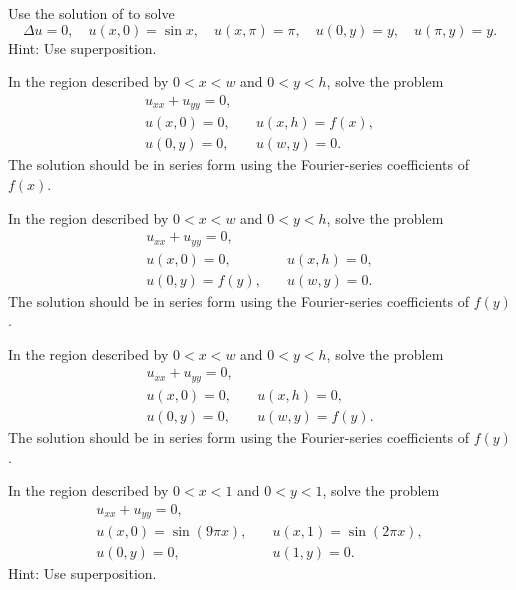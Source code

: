 \begin{exercise}
Use the solution of  to solve
\begin{equation*}
\Delta u = 0,
\quad u(x,0) = \sin x,
\quad u(x,\pi) = \pi,
\quad u(0,y) = y,
\quad u(\pi,y) = y .
\end{equation*}
Hint: Use superposition.
\end{exercise}

\begin{exercise}
In the region described by $0 < x < w$ and $0 < y < h$,
solve the problem
\begin{equation*}
\begin{array}{ll}
u_{xx} + u_{yy} = 0, & \\
u(x,0) = 0, \quad & u(x,h) = f(x), \\
u(0,y) = 0, \quad & u(w,y) = 0.
\end{array}
\end{equation*}
The solution should be in series form using the Fourier-series coefficients
of $f(x)$.
\end{exercise}

\begin{exercise}
In the region described by $0 < x < w$ and $0 < y < h$,
solve the problem
\begin{equation*}
\begin{array}{ll}
u_{xx} + u_{yy} = 0, & \\
u(x,0) = 0, \quad & u(x,h) = 0, \\
u(0,y) = f(y), \quad & u(w,y) = 0.
\end{array}
\end{equation*}
The solution should be in series form using the Fourier-series coefficients
of $f(y)$.
\end{exercise}

\begin{exercise}
In the region described by $0 < x < w$ and $0 < y < h$,
solve the problem
\begin{equation*}
\begin{array}{ll}
u_{xx} + u_{yy} = 0, & \\
u(x,0) = 0, \quad & u(x,h) = 0, \\
u(0,y) = 0, \quad & u(w,y) = f(y).
\end{array}
\end{equation*}
The solution should be in series form using the Fourier-series coefficients
of $f(y)$.
\end{exercise}

\begin{exercise}
In the region described by $0 < x < 1$ and $0 < y < 1$,
solve the problem
\begin{equation*}
\begin{array}{ll}
u_{xx} + u_{yy} = 0, & \\
u(x,0) = \sin (9 \pi x), \quad & u(x,1) = \sin (2 \pi x), \\
u(0,y) = 0, \quad & u(1,y) = 0 .
\end{array}
\end{equation*}
Hint: Use superposition.
\end{exercise}

